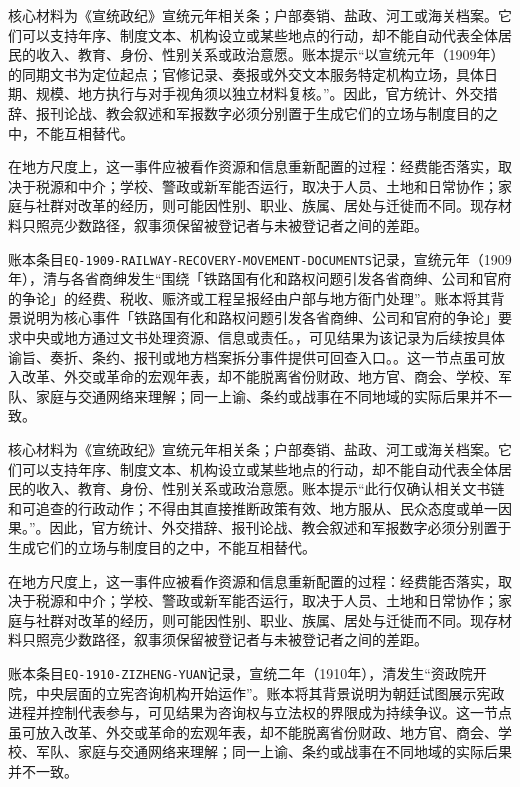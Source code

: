 核心材料为《宣统政纪》宣统元年相关条；户部奏销、盐政、河工或海关档案。它们可以支持年序、制度文本、机构设立或某些地点的行动，却不能自动代表全体居民的收入、教育、身份、性别关系或政治意愿。账本提示“以宣统元年（1909年）的同期文书为定位起点；官修记录、奏报或外交文本服务特定机构立场，具体日期、规模、地方执行与对手视角须以独立材料复核。”。因此，官方统计、外交措辞、报刊论战、教会叙述和军报数字必须分别置于生成它们的立场与制度目的之中，不能互相替代。

在地方尺度上，这一事件应被看作资源和信息重新配置的过程：经费能否落实，取决于税源和中介；学校、警政或新军能否运行，取决于人员、土地和日常协作；家庭与社群对改革的经历，则可能因性别、职业、族属、居处与迁徙而不同。现存材料只照亮少数路径，叙事须保留被登记者与未被登记者之间的差距。

账本条目\texttt{EQ-1909-RAILWAY-RECOVERY-MOVEMENT-DOCUMENTS}记录，宣统元年（1909年），清与各省商绅发生“围绕「铁路国有化和路权问题引发各省商绅、公司和官府的争论」的经费、税收、赈济或工程呈报经由户部与地方衙门处理”。账本将其背景说明为核心事件「铁路国有化和路权问题引发各省商绅、公司和官府的争论」要求中央或地方通过文书处理资源、信息或责任。，可见结果为该记录为后续按具体谕旨、奏折、条约、报刊或地方档案拆分事件提供可回查入口。。这一节点虽可放入改革、外交或革命的宏观年表，却不能脱离省份财政、地方官、商会、学校、军队、家庭与交通网络来理解；同一上谕、条约或战事在不同地域的实际后果并不一致。

核心材料为《宣统政纪》宣统元年相关条；户部奏销、盐政、河工或海关档案。它们可以支持年序、制度文本、机构设立或某些地点的行动，却不能自动代表全体居民的收入、教育、身份、性别关系或政治意愿。账本提示“此行仅确认相关文书链和可追查的行政动作；不得由其直接推断政策有效、地方服从、民众态度或单一因果。”。因此，官方统计、外交措辞、报刊论战、教会叙述和军报数字必须分别置于生成它们的立场与制度目的之中，不能互相替代。

在地方尺度上，这一事件应被看作资源和信息重新配置的过程：经费能否落实，取决于税源和中介；学校、警政或新军能否运行，取决于人员、土地和日常协作；家庭与社群对改革的经历，则可能因性别、职业、族属、居处与迁徙而不同。现存材料只照亮少数路径，叙事须保留被登记者与未被登记者之间的差距。

账本条目\texttt{EQ-1910-ZIZHENG-YUAN}记录，宣统二年（1910年），清发生“资政院开院，中央层面的立宪咨询机构开始运作”。账本将其背景说明为朝廷试图展示宪政进程并控制代表参与，可见结果为咨询权与立法权的界限成为持续争议。这一节点虽可放入改革、外交或革命的宏观年表，却不能脱离省份财政、地方官、商会、学校、军队、家庭与交通网络来理解；同一上谕、条约或战事在不同地域的实际后果并不一致。

